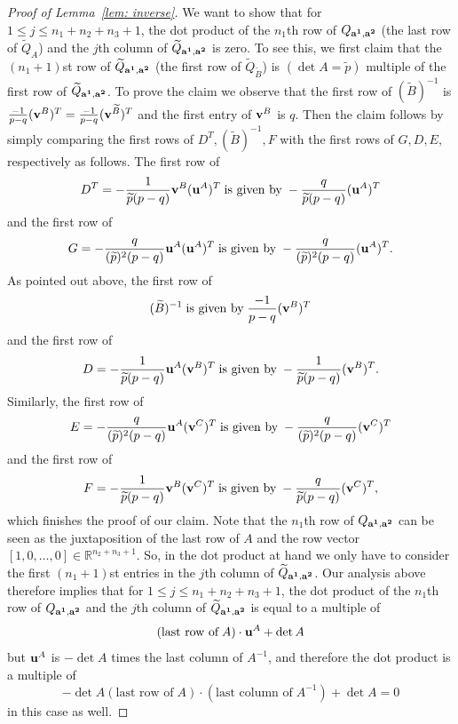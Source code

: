 \documentclass[11pt]{amsart}
\theoremstyle{plain}
\theoremstyle{definition}
\theoremstyle{remark}
\numberwithin{theorem}{section}
\begin{document}
\begin{proof} [Proof of Lemma~\ref{lem: inverse}]
We want to show  that for $1 \leq j \leq n_1+n_2+n_3+1$, the dot product of the $n_1$th row of $Q_{{\bf a^1}, {\bf a^2}}$ (the last row of $\widetilde{Q}_A$) and the $j$th  column of $\widetilde{Q}_{{\bf a^1}, {\bf a^2}}$ is zero. To see this,  we first claim that the $(n_1+1)$st row of  $\widetilde{Q}_{{\bf a^1}, {\bf a^2}}$ (the first row of $\widetilde{Q}_{\widetilde{B}}$) is $(\det A=\widetilde{p})$ multiple of the first row of $\widetilde{Q}_{{\bf a^1}, {\bf a^2}}$. To prove the claim we observe that the first row of $(\widetilde{B})^{-1}$ is $\frac{-1}{p-q} ({\bf v}^B)^T=\frac{-1}{p-q} ({\bf v}^{\widetilde{B}})^T$ and the first entry of ${\bf v}^B$ is $q$. Then the  claim follows by simply comparing the first rows of  $D^T, (\widetilde{B})^{-1}, F$   with the first rows of $G, D, E,$ respectively as follows. The first row of $$D^T = -\dfrac{1}{\widetilde{p} (p-q)}   {\bf v}^B ({\bf u}^A)^T \; \mbox{is given by} \;    -\dfrac{q}{\widetilde{p} (p-q)} ({\bf u}^A)^T$$ and the first row of $$G= -\dfrac{q}{(\widetilde{p})^2(p-q)}  {\bf u}^A ( {\bf u}^A)^T \; \mbox{is given by} \;   -\dfrac{q}{(\widetilde{p})^2(p-q)} ( {\bf u}^A)^T.$$ As pointed out above, the first row of 
$$(\widetilde{B})^{-1}  \; \mbox{is given by} \; \frac{-1}{p-q} ({\bf v}^B)^T$$ and the first row of $$D = -\dfrac{1}{\widetilde{p} (p-q)}  {\bf u}^A ({\bf v}^B)^T   \; \mbox{is given by} \;    -\dfrac{1}{\widetilde{p} (p-q)} ({\bf v}^B)^T.$$ Similarly,  the first row of $$E = -\dfrac{q}{(\widetilde{p})^2(p-q)}   {\bf u}^A  ({\bf v}^C)^T \; \mbox{is given by} \;    -\dfrac{q}{(\widetilde{p})^2(p-q)} ({\bf v}^C)^T$$ and the first row of $$F=  -\dfrac{1}{\widetilde{p} (p-q)}   {\bf v}^B ({\bf v}^C)^T \; \mbox{is given by} \;   -\dfrac{q}{\widetilde{p} (p-q)} ({\bf v}^C)^T,$$ which finishes the proof of our claim. Note that the $n_1$th row of $Q_{{\bf a^1}, {\bf a^2}}$  can be seen as the  juxtaposition of the last row of $A$ and the row vector $[1, 0, \dots, 0] \in \mathbb{R}^{n_2+n_3+1}$. So, in the dot product at hand we only have to consider the first $(n_1+1)$st entries  in the $j$th column of $\widetilde{Q}_{{\bf a^1}, {\bf a^2}}$. Our analysis above therefore implies that for $1 \leq j \leq n_1+n_2+n_3+1$, the dot product of the $n_1$th row of $Q_{{\bf a^1}, {\bf a^2}}$ and the $j$th column of $\widetilde{Q}_{{\bf a^1}, {\bf a^2}}$ is equal to a multiple of $$(\mbox{last row of}\; A) \cdot {\bf u}^A + \det A$$ but ${\bf u}^A$ is $-\det A$ times the last column of $A^{-1}$, and therefore the dot product is a multiple of 
$$-\det A (\mbox{last row of}\; A) \cdot (\mbox{last column of}\; A^{-1} )+ \det A=0$$
 in this case as well.  


\end{proof}
\end{document}
